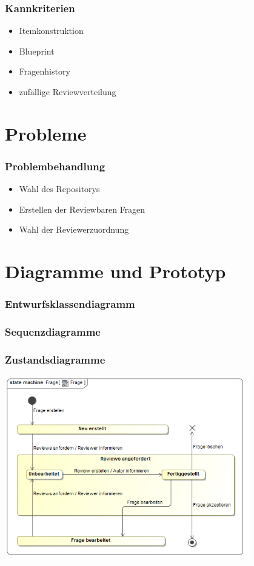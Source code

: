 \documentclass{beamer}
\begin{document}
		\begin{frame} %
		  	\frametitle{Kannkriterien} %
  			\begin{itemize}
  				\item Itemkonstruktion
			  	\item Blueprint
			    \item Fragenhistory
			    \item zufällige Reviewverteilung
			\end{itemize}
		\end{frame}

	\section{Probleme}
		\begin{frame} %
			\frametitle{Problembehandlung} %
    		\begin{itemize}
    			\item Wahl des Repositorys
		    	\item Erstellen der Reviewbaren Fragen
    			\item Wahl der Reviewerzuordnung
    		\end{itemize}
		\end{frame}

	\section{Diagramme und Prototyp}
		\begin{frame} %
			\frametitle{Entwurfsklassendiagramm} %
			\label{Entwurfsklassendiagramm}
		\end{frame}

		\begin{frame} %
			\frametitle{Sequenzdiagramme} %
			\label{Sequenzdiagramme}
		\end{frame}

		\begin{frame} %
			\frametitle{Zustandsdiagramme} %
			\includegraphics[width=0.8\textwidth]{../Diagramme/State_Machine_Diagram__Frage__Frage.png}
			\label{Zustandsdiagramme}
		\end{frame}
\end{document}
